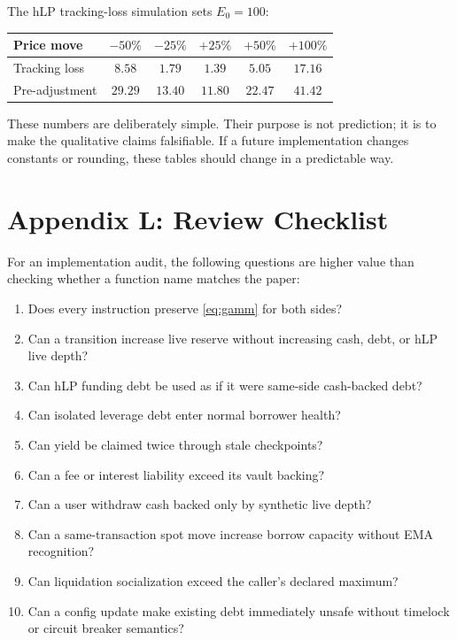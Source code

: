 \documentclass[11pt]{article}
\begin{document}
The hLP tracking-loss simulation sets $E_0=100$:
\begin{center}
\begin{tabular}{lccccc}
\toprule
Price move & $-50\%$ & $-25\%$ & $+25\%$ & $+50\%$ & $+100\%$ \\
\midrule
Tracking loss & $8.58$ & $1.79$ & $1.39$ & $5.05$ & $17.16$ \\
Pre-adjustment & $29.29$ & $13.40$ & $11.80$ & $22.47$ & $41.42$ \\
\bottomrule
\end{tabular}
\end{center}

These numbers are deliberately simple. Their purpose is not prediction; it is to make the qualitative claims falsifiable. If a future implementation changes constants or rounding, these tables should change in a predictable way.

\section{Appendix L: Review Checklist}

For an implementation audit, the following questions are higher value than checking whether a function name matches the paper:
\begin{enumerate}
  \item Does every instruction preserve \eqref{eq:gamm} for both sides?
  \item Can a transition increase live reserve without increasing cash, debt, or hLP live depth?
  \item Can hLP funding debt be used as if it were same-side cash-backed debt?
  \item Can isolated leverage debt enter normal borrower health?
  \item Can yield be claimed twice through stale checkpoints?
  \item Can a fee or interest liability exceed its vault backing?
  \item Can a user withdraw cash backed only by synthetic live depth?
  \item Can a same-transaction spot move increase borrow capacity without EMA recognition?
  \item Can liquidation socialization exceed the caller's declared maximum?
  \item Can a config update make existing debt immediately unsafe without timelock or circuit breaker semantics?
\end{enumerate}
\end{document}
